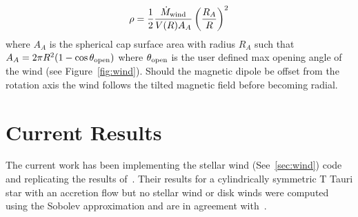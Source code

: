 \documentclass[fleqn,usenatbib]{mnras}
\begin{document}
\begin{equation}
    \rho = \frac{1}{2}\frac{\dot{M}_{\rm wind}}{V(R)A_{A}}\left( \frac{R_{A}}{R}\right)^2
\end{equation}
where $A_A$ is the spherical cap surface area with radius $R_A$ such that $A_A = 2\pi R^2 (1-\cos\theta_{\rm open})$ where $\theta_{\rm open}$ is the user defined max opening angle of the wind (see Figure~\ref{fig:wind}). Should the magnetic dipole be offset from the rotation axis the wind follows the tilted magnetic field before becoming radial.

\section{Current Results}
\label{sec:results}

The current work has been implementing the stellar wind (See~\ref{sec:wind}) code and replicating the results of~\citet{1998ApJ...492..743M}. Their results for a cylindrically symmetric T Tauri star with an accretion flow but no stellar wind or disk winds were computed using the Sobolev approximation and are in agreement with~\citet{Hartmann:1994tl}.
\end{document}
